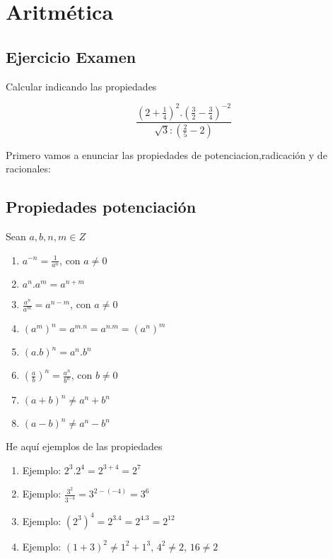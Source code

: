     \section{Aritmética}
    
    \subsection{Ejercicio Examen}
    
    Calcular indicando las  propiedades
    
    $$ \frac{\left( 2+ \frac{1}{4} \right)^{2} . \left( \frac{3}{2}-\frac{3}{4} \right)^{-2}}{\sqrt{3}: \left( \frac{2}{5}-2 \right)} $$
    
    Primero vamos a enunciar las propiedades de potenciacion,radicación y de racionales:
    
    \subsection{Propiedades potenciación}
    Sean $a,b,n,m \in Z$
    \begin{enumerate}
        \item $ a^{-n}=\frac{1}{a^n} $, con $a \ne 0$
        \item $a^{n}.a^{m} = a^{n+m} $
        \item $ \frac{a^{n}}{a^{m}}= a^{n-m} $, con $a \ne 0$
        \item $ (a^m)^n=a^{m.n}=a^{n.m}=(a^n)^m $
        \item $ (a.b)^{n} = a^{n}.b^{n} $
        \item $ \left( \frac{a}{b}\right)^{n}  = \frac{a^n}{b^n} $, con $b \ne 0$ 
        \item $ (a+b)^{n} \ne a^{n} + b^{n}$
        \item $ (a-b)^{n} \ne a^{n} - b^{n}$
    \end{enumerate}
    
    
    He aquí ejemplos de las propiedades
    
    \begin{enumerate}
        \item Ejemplo: $2^{3}.2^{4}= 2^{3+4}=2^{7}$
        \item Ejemplo: $\frac{3^2}{3^{-4}}= 3^{2-(-4)}=3^{6}$
        \item Ejemplo: $(2^3)^4=2^{3.4}=2^{4.3}=2^{12}$
        \item Ejemplo: $(1+3)^2 \neq 1^2+1^3 $, $4^2 \neq 2 $, $16 \neq 2$
    \end{enumerate}
    

